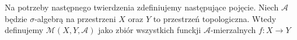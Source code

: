 \begin{defi}
    Na potrzeby następnego twierdzenia zdefiniujemy następujące pojęcie. Niech $\mathcal{A}$ będzie
    $\sigma$-algebrą na przestrzeni $X$ oraz $Y$ to przestrzeń topologiczna. Wtedy definujemy $\mathcal{M}(X,Y,\mathcal{A})$
    jako zbiór wszystkich funckji $\mathcal{A}$-mierzalnych $f:X \rightarrow Y$
\end{defi}